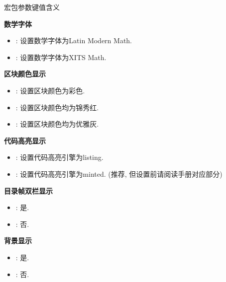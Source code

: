 \documentclass[hyperref,UTF8,11pt,CJK]{beamer}
\begin{document}
\begin{frame}[fragile]{宏包参数键值含义}
	\scriptsize
	\begin{multicols}{3}
		\textcolor{JXred}{}\hfill \textbf{数学字体}
		\begin{itemize}
			\item {}: 设置数学字体为Latin Modern Math.
			\item {}: 设置数学字体为XITS Math.
		\end{itemize}
		\textcolor{JXred}{}\hfill \textbf{区块颜色显示}
		\begin{itemize}
			\item {}: 设置区块颜色为彩色.
			\item {}: 设置区块颜色均为锦秀红.
			\item {}: 设置区块颜色均为优雅灰.
		\end{itemize}
		\textcolor{JXred}{}\hfill \textbf{代码高亮显示}
		\begin{itemize}
			\item {}: 设置代码高亮引擎为listing.
			\item {}: 设置代码高亮引擎为minted. (推荐, 但设置前请阅读手册对应部分)
		\end{itemize}
		\textcolor{JXred}{}\hfill \textbf{目录帧双栏显示}
		\begin{itemize}
			\item {}: 是.
			\item {}: 否.
		\end{itemize}
		\textcolor{JXred}{}\hfill \textbf{背景显示}
		\begin{itemize}
			\item {}: 是.
			\item {}: 否.
		\end{itemize}
	\end{multicols}
\end{frame}
\end{document}
